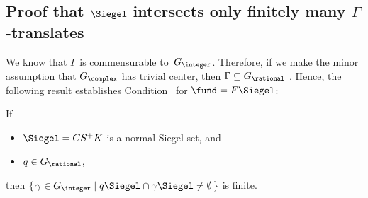 \subsection{Proof that $\Siegel$ intersects only finitely many $\Gamma$-translates} \label{SiegelPropertySect}
We know that $\Gamma$ is commensurable to~$G_\integer$. Therefore, if we make the minor assumption that $G_\complex$ has trivial center, then $\Gamma \subseteq G_\rational$ . Hence, the following result establishes Condition~ for $\fund = F \Siegel$:

\begin{thm} \label{SiegelProperty}
If
\noprelistbreak
	\begin{itemize}
	\item $\Siegel = C S^+ K$ is a normal Siegel set,
	and
	\item $q \in G_{\rational}$,
	\end{itemize}
then 
	$\{\, \gamma \in G_\integer \mid q \Siegel \cap  \gamma \Siegel \neq \emptyset \,\}$ 
is finite.
\end{thm}

